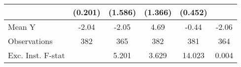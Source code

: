 {\begin{tabular}{l*{5}{c}}
            &     (0.201)         &     (1.586)         &     (1.366)         &     (0.452)         &                     \\
\midrule
Mean Y      &       -2.04         &       -2.05         &        4.69         &       -0.44         &       -2.06         \\
Observations&         382         &         365         &         382         &         381         &         364         \\
Exc. Inst. F-stat&                     &       5.201         &       3.629         &      14.023         &       0.004         \\
\bottomrule
\end{tabular}
}

